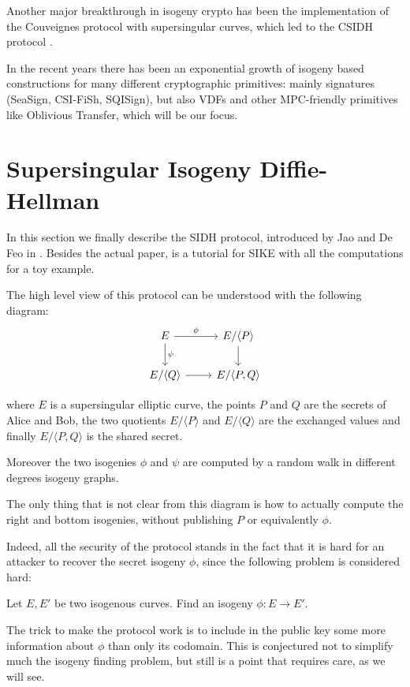 Another major breakthrough in isogeny crypto has been the implementation of the Couveignes protocol with supersingular curves, which led to the CSIDH protocol \cite{CSIDH}.

In the recent years there has been an exponential growth of isogeny based constructions for many different cryptographic primitives: mainly signatures (SeaSign, CSI-FiSh, SQISign), but also VDFs and other MPC-friendly primitives like Oblivious Transfer, which will be our focus.

\section{Supersingular Isogeny Diffie-Hellman}
In this section we finally describe the SIDH protocol, introduced by Jao and De Feo in \cite{SIDH11}. Besides the actual paper, \cite{Costello_SIKE} is a tutorial for SIKE with all the computations for a toy example.

The high level view of this protocol can be understood with the following diagram:
\[\begin{tikzcd}
E \rar["\phi"] \dar["\psi"] & E/\langle P\rangle \dar\\
E/\langle Q\rangle \rar & E/\langle P, Q\rangle
\end{tikzcd}\]

where $E$ is a supersingular elliptic curve, the points $P$ and $Q$ are the secrets of Alice and Bob, the two quotients $E/\langle P\rangle$ and $E/\langle Q\rangle$ are the exchanged values and finally $E/\langle P, Q\rangle$ is the shared secret.

Moreover the two isogenies $\phi$ and $\psi$ are computed by a random walk in different degrees isogeny graphs.

The only thing that is not clear from this diagram is how to actually compute the right and bottom isogenies, without publishing $P$ or equivalently $\phi$.

Indeed, all the security of the protocol stands in the fact that it is hard for an attacker to recover the secret isogeny $\phi$, since the following problem is considered hard:
\begin{problem}
    Let $E,E'$ be two isogenous curves. Find an isogeny $\phi: E\to E'$.
\end{problem}

The trick to make the protocol work is to include in the public key some more information about $\phi$ than only its codomain. This is conjectured not to simplify much the isogeny finding problem, but still is a point that requires care, as we will see.

